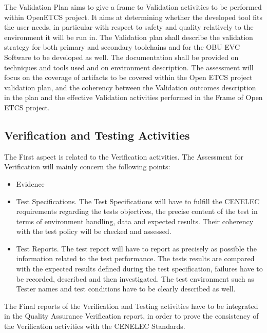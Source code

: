 \documentclass{template/openetcs_article}
\begin{document}
The Validation Plan aims to give a frame to Validation activities to be performed within OpenETCS project. It aims at determining whether the developed tool fits the user needs, in particular with respect to safety and quality relatively to the environment it will be run in.
The Validation plan shall describe the validation strategy for both primary and secondary toolchains and for the OBU EVC Software to be developed as well. The documentation shall be provided on techniques and tools used and on environment description. The assessment will focus on the coverage of artifacts to be covered within the Open ETCS project validation plan, and the coherency between the Validation outcomes description in the plan and the effective Validation activities performed in the Frame of Open ETCS project.

\subsection{Verification and Testing Activities}
The First aspect is related to the Verification activities. The Assessment for Verification will mainly concern the following points:
\begin{itemize}
\item Evidence
\item Test Specifications. The Test Specifications will have to fulfill the CENELEC requirements regarding the tests objectives, the precise content of the test in terms of environment handling, data and expected results. Their coherency with the test policy will be checked and assessed.
\item  Test Reports. The test report will have to report as precisely as possible the information related to the test performance. The tests results are compared with the expected results defined during the test specification, failures have to be recorded, described and then investigated. The test environment such as Tester names and test conditions have to be clearly described as well.
\end{itemize}
The Final reports of the Verification and Testing activities have to be integrated in the Quality Assurance Verification report, in order to prove the consistency of the Verification activities with the CENELEC Standards.
\end{document}
